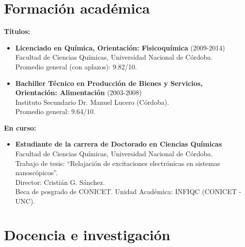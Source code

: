 \documentclass[10pt]{article}
\begin{document}
\section{Formación académica}
{\bf Títulos:}
\begin{itemize}
\item {\bf Licenciado en Química, Orientación: Fisicoquímica} (2009-2014) \\
Facultad de Ciencias Químicas, Universidad Nacional de Córdoba. \\
Promedio general (con aplazos): 9.82/10.
\item {\bf Bachiller Técnico en Producción de Bienes y Servicios,  \\ Orientación: Alimentación} (2003-2008) \\
Instituto Secundario Dr. Manuel Lucero (C\'ordoba). \\
Promedio general: 9.64/10.
\end{itemize}
{\bf En curso:}
\begin{itemize}
\item {\bf Estudiante de la carrera de Doctorado en Ciencias Químicas} \\
Facultad de Ciencias Químicas, Universidad Nacional de Córdoba. \\
Trabajo de tesis: ``Relajación de excitaciones electrónicas en sistemas nanoscópicos''. \\
Director: Cristián G. Sánchez. \\
Beca de  posgrado de CONICET. 
Unidad Académica: INFIQC (CONICET - UNC). 
\end{itemize}

\section{Docencia e investigación}
\end{document}
